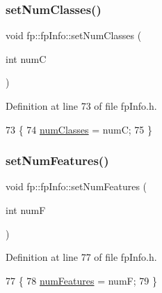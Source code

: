\subsubsection{\texorpdfstring{set\+Num\+Classes()}{setNumClasses()}}
{\footnotesize\ttfamily void fp\+::fp\+Info\+::set\+Num\+Classes (\begin{DoxyParamCaption}\item[{int}]{numC }\end{DoxyParamCaption})\hspace{0.3cm}{\ttfamily [inline]}}



Definition at line 73 of file fp\+Info.\+h.


\begin{DoxyCode}
73                                                \{
74                 \hyperlink{classfp_1_1fpInfo_a1c98a9ced12230f21003f78d742625a3}{numClasses} = numC;
75             \}
\end{DoxyCode}
\mbox{\label{classfp_1_1fpInfo_a69ef99f2ec9ef74dd3787bc33ffb05d0}} 
\subsubsection{\texorpdfstring{set\+Num\+Features()}{setNumFeatures()}}
{\footnotesize\ttfamily void fp\+::fp\+Info\+::set\+Num\+Features (\begin{DoxyParamCaption}\item[{int}]{numF }\end{DoxyParamCaption})\hspace{0.3cm}{\ttfamily [inline]}}



Definition at line 77 of file fp\+Info.\+h.


\begin{DoxyCode}
77                                                 \{
78                 \hyperlink{classfp_1_1fpInfo_a6ed8deabebae772fc213730cd29a2e61}{numFeatures} = numF;
79             \}
\end{DoxyCode}
\mbox{\label{classfp_1_1fpInfo_ad17492e79df7bca55d98438fec2f004b}} 
